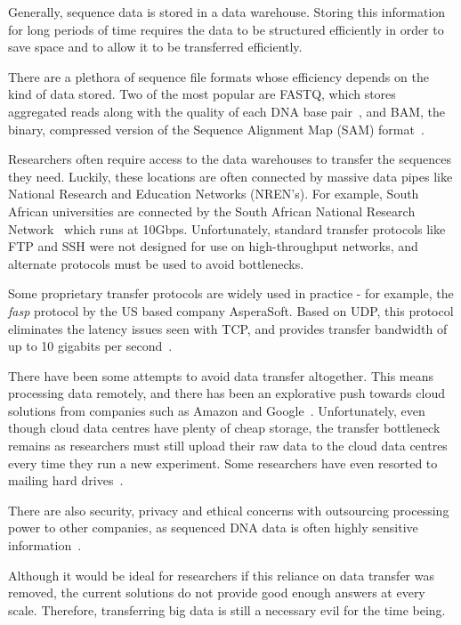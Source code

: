 \documentclass{sig-alternate-05-2015}
\begin{document}
Generally, sequence data is stored in a data warehouse. Storing this information for long periods of time requires the data to be structured efficiently in order to save space and to allow it to be transferred efficiently.

There are a plethora of sequence file formats whose efficiency depends on the kind of data stored. Two of the most popular are FASTQ, which stores aggregated reads along with the quality of each DNA base pair~\cite{cock2010sanger}, and BAM, the binary, compressed version of the Sequence Alignment Map (SAM) format~\cite{SAMspec}.

Researchers often require access to the data warehouses to transfer the sequences they need. Luckily, these locations are often connected by massive data pipes like National Research and Education Networks (NREN's). For example, South African universities are connected by the South African National Research Network~\cite{sanren} which runs at 10Gbps. Unfortunately, standard transfer protocols like FTP and SSH were not designed for use on high-throughput networks, and alternate protocols must be used to avoid bottlenecks.

Some proprietary transfer protocols are widely used in practice - for example, the \textit{fasp} protocol by the US based company AsperaSoft. Based on UDP, this protocol eliminates the latency issues seen with TCP, and provides transfer bandwidth of up to 10 gigabits per second~\cite{fan2010petabytes}.

There have been some attempts to avoid data transfer altogether. This means processing data remotely, and there has been an explorative push towards cloud solutions from companies such as Amazon and Google~\cite{baker2010next}. Unfortunately, even though cloud data centres have plenty of cheap storage, the transfer bottleneck remains as researchers must still upload their raw data to the cloud data centres every time they run a new experiment. Some researchers have even resorted to mailing hard drives~\cite{baker2010next}.

There are also security, privacy and ethical concerns with outsourcing processing power to other companies, as sequenced DNA data is often highly sensitive information~\cite{marx2013biology}.

Although it would be ideal for researchers if this reliance on data transfer was removed, the current solutions do not provide good enough answers at every scale. Therefore, transferring big data is still a necessary evil for the time being.
\end{document}
